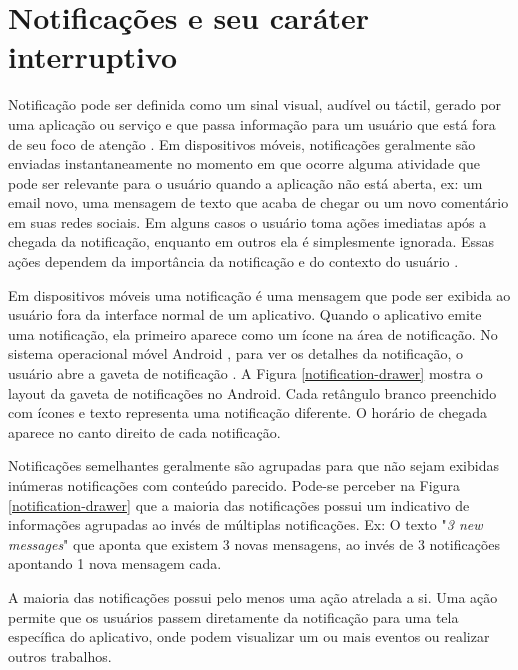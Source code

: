 \section{Notificações e seu caráter interruptivo}
\label{notificacao}

Notificação pode ser definida como um sinal visual, audível ou táctil, gerado por uma aplicação
ou serviço e que passa informação para um usuário que está fora de seu foco de atenção \cite{iqbal2010notifications}.
Em dispositivos móveis, notificações geralmente são enviadas instantaneamente no momento em que ocorre alguma atividade que pode ser relevante
para o usuário quando a aplicação não está aberta, ex: um email novo, uma mensagem de texto que acaba de chegar ou um
novo comentário em suas redes sociais. Em alguns casos o usuário toma ações imediatas após a chegada da notificação,
enquanto em outros ela é simplesmente ignorada. Essas ações dependem da importância da notificação e do contexto do
usuário \cite{sahami2014large}.

Em dispositivos móveis uma notificação é uma mensagem que pode ser exibida ao usuário fora da interface normal de um aplicativo.
Quando o aplicativo emite uma notificação, ela primeiro aparece como um ícone na área de notificação. No sistema operacional móvel
Android \cite{android}, para ver os detalhes da notificação, o usuário abre a gaveta de notificação \cite{notificationDrawer}. A Figura
\ref{notification-drawer} mostra o layout da gaveta de notificações no Android. Cada retângulo branco preenchido com ícones
e texto representa uma notificação diferente. O horário de chegada aparece no canto direito de cada notificação.

Notificações semelhantes geralmente são agrupadas para que não sejam exibidas inúmeras notificações com conteúdo parecido.
Pode-se perceber na Figura \ref{notification-drawer} que a maioria das notificações possui um indicativo de informações agrupadas
ao invés de múltiplas notificações. Ex: O texto "\textit{3 new messages}" que aponta que existem 3 novas mensagens, ao invés de 3
notificações apontando 1 nova mensagem cada.

A maioria das notificações possui pelo menos uma ação atrelada a si. Uma ação permite que os usuários passem
diretamente da notificação para uma tela específica do aplicativo, onde podem visualizar um ou mais eventos ou realizar
outros trabalhos.


